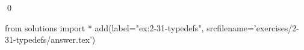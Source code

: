 
\begin{ex}
  \label{ex:2-31-typedefs}
  
  \qed
\end{ex}
\begin{python0}
from solutions import *
add(label="ex:2-31-typedefs",
    srcfilename='exercises/2-31-typedefs/answer.tex')
\end{python0}
